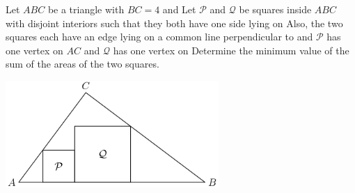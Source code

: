Let $ ABC$ be a triangle with  $ BC = 4$ and  Let $ \mathcal P$ and $ \mathcal Q$ be squares inside $ ABC$ with disjoint interiors such that they both have one side lying on  Also, the two squares each have an edge lying on a common line perpendicular to  and $ \mathcal P$ has one vertex on $ AC$ and $ \mathcal Q$ has one vertex on  Determine the minimum value of the sum of the areas of the two squares.

\begin{center}
\includegraphics[width = 81.0mm]{img/fig0.png}
\end{center}